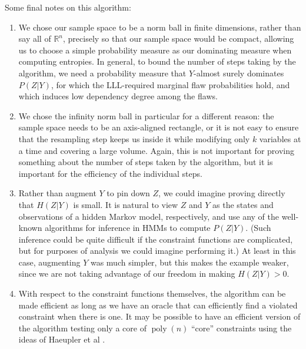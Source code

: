 \documentclass[twocolumn]{article}
\newcommand{\Reals}%
  {\mathbb{R}}
\begin{document}
Some final notes on this algorithm:
\begin{enumerate}
  \item We chose our sample space to be a norm ball in finite dimensions, rather than say all of $\Reals^n$, precisely so that our sample space would be compact, allowing us to choose a simple probability measure as our dominating measure when computing entropies.  In general, to bound the number of steps taking by the algorithm, we need a probability measure that $Y$-almost surely dominates $P(Z | Y)$, for which the LLL-required marginal flaw probabilities hold, and which induces low dependency degree among the flaws.
  \item We chose the infinity norm ball in particular for a different reason: the sample space needs to be an axis-aligned rectangle, or it is not easy to ensure that the resampling step keeps us inside it while modifying only $k$ variables at a time and covering a large volume.  Again, this is not important for proving something about the number of steps taken by the algorithm, but it is important for the efficiency of the individual steps.
  \item Rather than augment $Y$ to pin down $Z$, we could imagine proving directly that $H(Z | Y)$ is small.  It is natural to view $Z$ and $Y$ as the states and observations of a hidden Markov model, respectively, and use any of the well-known algorithms for inference in HMMs to compute $P(Z | Y)$.  (Such inference could be quite difficult if the constraint functions are complicated, but for purposes of analysis we could imagine performing it.)  At least in this case, augmenting $Y$ was much simpler, but this makes the example weaker, since we are not taking advantage of our freedom in making $H(Z | Y) > 0$.
  \item With respect to the constraint functions themselves, the algorithm can be made efficient as long as we have an oracle that can efficiently find a violated constraint when there is one.  It may be possible to have an efficient version of the algorithm testing only a core of $\operatorname{poly}(n)$ ``core'' constraints using the ideas of Haeupler et al \cite{haeupler2011new}.
\end{enumerate}

\end{document}
